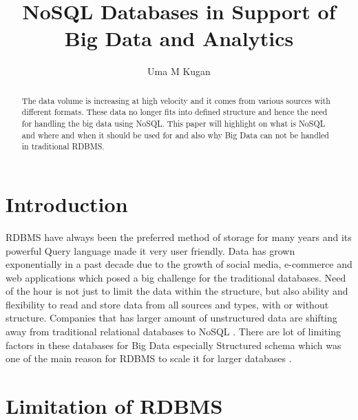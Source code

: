 \documentclass[sigconf]{acmart}
\begin{document}
\title{NoSQL Databases in Support of Big Data and Analytics}


\author{Uma M Kugan}

\renewcommand{\shortauthors}{Uma}


\begin{abstract}
The data volume is increasing at high velocity and it comes from various sources with different formats. These data no longer fits into defined structure and hence the need for handling the big data using NoSQL. This paper will highlight on what is NoSQL and where and when it should be used for and also why Big Data can not be handled in traditional RDBMS.
\end{abstract}



\maketitle

\section{Introduction}

RDBMS have always been the preferred method of storage for many years and its powerful Query language made it very user friendly. Data has grown exponentially in a past decade due to the growth of social media, e-commerce and web applications which posed a big challenge for the traditional databases. Need of the hour is not just to limit the data within the structure, but also ability and flexibility to read and store data from all sources and types, with or without structure. Companies that has larger amount of unstructured data are shifting away from traditional relational databases to NoSQL \cite{neal}. There are lot of limiting factors in these databases for Big Data especially Structured schema which was one of the main reason for RDBMS to scale it for larger databases \cite{aspire}.

\section{Limitation of RDBMS}
\end{document}
